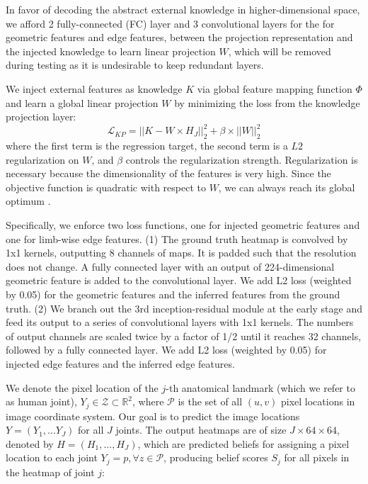 \documentclass[journal ]{IEEEtran}
\begin{document}
In favor of decoding the abstract external knowledge in higher-dimensional space, we afford 2 fully-connected (FC) layer and 3 convolutional layers for the for geometric features and edge features, between the projection representation and the injected knowledge to learn linear projection $W$, which will be removed during testing as it is undesirable to keep redundant layers.

We inject external features as knowledge $K$ via global feature mapping function $\Phi$ and learn a global linear projection $W$ by minimizing the loss from the knowledge projection layer:
\begin{equation}
\mathcal{L}_{KP} = ||K - W \times H_{J}||_{2}^{2} + \beta \times ||W||_{2}^{2}
\end{equation}
where the first term is the regression target, the second term is a $L2$ regularization on $W$, and $\beta$ controls the regularization strength. Regularization is necessary because the dimensionality of the features is very high. Since the objective function is quadratic with respect to $W$, we can always reach its global optimum \cite{ren2014face}.

Specifically,  
we enforce two 
loss functions, one for injected geometric features and one for limb-wise edge features.  (1) The ground truth heatmap is convolved by 1x1 kernels, outputting 8 channels of maps. It is padded such that the resolution does not change. A fully connected layer with an output of 224-dimensional geometric feature is added to the convolutional layer. We add L2 loss (weighted by 0.05) for the geometric features and the inferred features from the ground truth. (2) We branch out the 3rd inception-residual module at the early stage and feed its output to a series of convolutional layers with 1x1 kernels. The numbers of output channels are scaled twice by a factor of 1/2 until it reaches 32 channels, followed by a fully connected layer. We add L2 loss (weighted by 0.05) for injected edge features and the inferred edge features. 


We denote the pixel location of the $j$-th anatomical landmark (which we refer to as human joint), $Y_j \in \mathcal{Z} \subset \mathbb{R}^{2}$, where $\mathcal{P}$ is the set of all $(u, v)$ pixel locations in image coordinate system. Our goal is to predict the image locations $Y = (Y_{1}, ... Y_{J})$ for all $J$ joints.
The output heatmaps are of size $J \times 64 \times 64$, denoted by $H = (H_{1}, ..., H_{J})$, which are predicted beliefs for assigning a pixel location to each joint $Y_j = p, \forall z \in \mathcal{P}$, producing belief scores $S_{j}$ for all pixels in the heatmap of joint $j$:  
\end{document}
